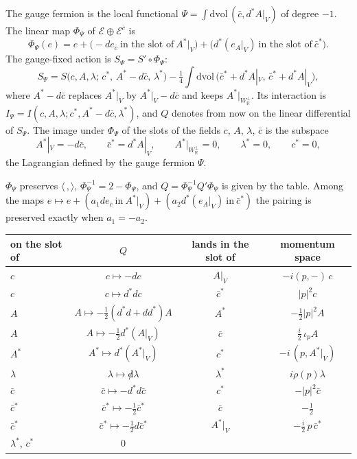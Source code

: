 \begin{definition}
\label{def:c3-psi}
The gauge fermion is the local functional $\Psi=\int\mathrm{dvol}\,(\bar c,d^*A|_V)$ of degree $-1$. The linear map $\Phi_\Psi$ of $\mathscr E\oplus\mathscr E^{\bar c}$ is
\[
\Phi_\Psi(e)=e+\big(-de_{\bar c}\ \text{in the slot of}\ A^*|_V\big)+\big(d^*(e_A|_V)\ \text{in the slot of}\ \bar c^*\big).
\]
The gauge-fixed action is $S_\Psi=S'\circ\Phi_\Psi$:
\begin{equation}
S_\Psi=S\big(c,A,\lambda;\,c^*,\,A^*-d\bar c,\,\lambda^*\big)-\tfrac14\int\mathrm{dvol}\,\big(\bar c^*+d^*A|_V,\,\bar c^*+d^*A|_V\big),
\label{eq:c3-SPsi}
\end{equation}
where $A^*-d\bar c$ replaces $A^*|_V$ by $A^*|_V-d\bar c$ and keeps $A^*|_{W_{\mathbb R}^\perp}$. Its interaction is $I_\Psi=I(c,A,\lambda;c^*,A^*-d\bar c,\lambda^*)$, and $Q$ denotes from now on the linear differential of $S_\Psi$. The image under $\Phi_\Psi$ of the slots of the fields $c$, $A$, $\lambda$, $\bar c$ is the subspace
\[
A^*|_V=-d\bar c,\qquad \bar c^*=d^*A|_V,\qquad A^*|_{W_{\mathbb R}^\perp}=0,\qquad \lambda^*=0,\qquad c^*=0,
\]
the Lagrangian defined by the gauge fermion $\Psi$.
\end{definition}

\begin{proposition}
\label{prop:c3-sympl}
$\Phi_\Psi$ preserves $\langle\,,\rangle$, $\Phi_\Psi^{-1}=2-\Phi_\Psi$, and $Q=\Phi_\Psi^{-1}Q'\Phi_\Psi$ is given by the table. Among the maps $e\mapsto e+(a_1de_{\bar c}\ \text{in}\ A^*|_V)+(a_2d^*(e_A|_V)\ \text{in}\ \bar c^*)$ the pairing is preserved exactly when $a_1=-a_2$.
\end{proposition}

\begin{tabular}{l|c|c|c}
on the slot of & $Q$ & lands in the slot of & momentum space \\
\hline
$c$ & $c\mapsto-dc$ & $A|_V$ & $-i(p,-)\,c$ \\
$c$ & $c\mapsto d^*dc$ & $\bar c^*$ & $|p|^2c$ \\
$A$ & $A\mapsto-\tfrac12(d^*d+dd^*)A$ & $A^*$ & $-\tfrac12|p|^2A$ \\
$A$ & $A\mapsto-\tfrac12d^*(A|_V)$ & $\bar c$ & $\tfrac i2\,\iota_pA$ \\
$A^*$ & $A^*\mapsto d^*(A^*|_V)$ & $c^*$ & $-i\,(p,A^*|_V)$ \\
$\lambda$ & $\lambda\mapsto{\not d}\lambda$ & $\lambda^*$ & $i\rho(p)\lambda$ \\
$\bar c$ & $\bar c\mapsto-d^*d\bar c$ & $c^*$ & $-|p|^2\bar c$ \\
$\bar c^*$ & $\bar c^*\mapsto-\tfrac12\bar c^*$ & $\bar c$ & $-\tfrac12$ \\
$\bar c^*$ & $\bar c^*\mapsto-\tfrac12d\bar c^*$ & $A^*|_V$ & $-\tfrac i2\,p\,\bar c^*$ \\
$\lambda^*$, $c^*$ & $0$ & & \\
\end{tabular}

